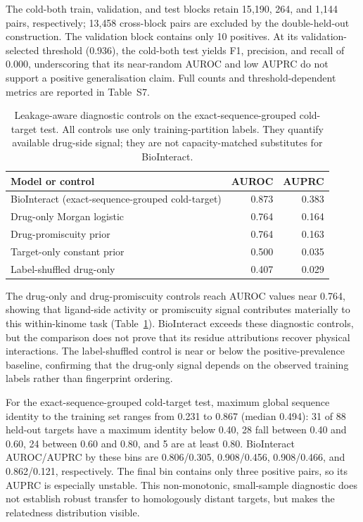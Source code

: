 \documentclass[fleqn,10pt]{wlscirep}
\begin{document}
The cold-both train, validation, and test blocks retain 15{,}190, 264, and
1{,}144 pairs, respectively; 13{,}458 cross-block pairs are excluded by the
double-held-out construction. The validation block contains only 10 positives.
At its validation-selected threshold (0.936), the cold-both test yields F1,
precision, and recall of 0.000, underscoring that its near-random AUROC and low
AUPRC do not support a positive generalisation claim. Full counts and
threshold-dependent metrics are reported in Table~S7.

\begin{table}[htbp]
\centering
\caption{Leakage-aware diagnostic controls on the exact-sequence-grouped
  cold-target test. All controls use only training-partition labels. They
  quantify available drug-side signal; they are not capacity-matched substitutes
  for BioInteract.}
\label{tab:diagnostic_controls}
\begin{tabular}{lrr}
\toprule
\textbf{Model or control} & \textbf{AUROC} & \textbf{AUPRC} \\
\midrule
BioInteract (exact-sequence-grouped cold-target) & 0.873 & 0.383 \\
Drug-only Morgan logistic         & 0.764 & 0.164 \\
Drug-promiscuity prior            & 0.764 & 0.163 \\
Target-only constant prior        & 0.500 & 0.035 \\
Label-shuffled drug-only          & 0.407 & 0.029 \\
\bottomrule
\end{tabular}
\end{table}

The drug-only and drug-promiscuity controls reach AUROC values near 0.764,
showing that ligand-side activity or promiscuity signal contributes materially
to this within-kinome task (Table~\ref{tab:diagnostic_controls}).  BioInteract
exceeds these diagnostic controls, but the comparison does not prove that its
residue attributions recover physical interactions.  The label-shuffled control
is near or below the positive-prevalence baseline, confirming that the drug-only
signal depends on the observed training labels rather than fingerprint ordering.

For the exact-sequence-grouped cold-target test, maximum global sequence identity to the
training set ranges from 0.231 to 0.867 (median 0.494): 31 of 88 held-out
targets have a maximum identity below 0.40, 28 fall between 0.40 and 0.60, 24
between 0.60 and 0.80, and 5 are at least 0.80.  BioInteract AUROC/AUPRC by
these bins are 0.806/0.305, 0.908/0.456, 0.908/0.466, and 0.862/0.121,
respectively.  The final bin contains only three positive pairs, so its AUPRC is
especially unstable.  This non-monotonic, small-sample diagnostic does not
establish robust transfer to homologously distant targets, but makes the
relatedness distribution visible.
\end{document}
